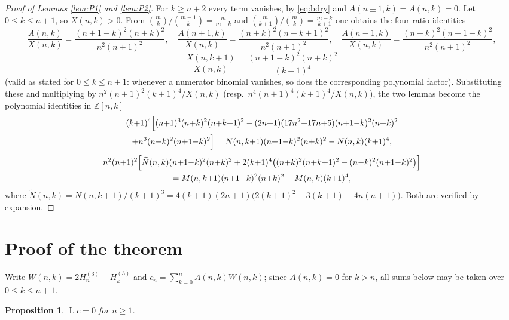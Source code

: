 \documentclass[11pt]{article}
\newtheorem{proposition}{Proposition}
\theoremstyle{remark}
\newcommand{\ZZ}{\mathbb{Z}}
\DeclareMathOperator{\Lop}{L}
\begin{document}
\begin{proof}[Proof of Lemmas \ref{lem:P1} and \ref{lem:P2}]
For $k\ge n+2$ every term vanishes, by \eqref{eq:bdry} and
$A(n\pm1,k)=A(n,k)=0$. Let $0\le k\le n+1$, so $X(n,k)>0$. From
$\binom{m}{k}\big/\binom{m-1}{k}=\frac{m}{m-k}$ and
$\binom{m}{k+1}\big/\binom{m}{k}=\frac{m-k}{k+1}$ one obtains the four ratio
identities
\[
\frac{A(n,k)}{X(n,k)}=\frac{(n{+}1{-}k)^{2}(n{+}k)^{2}}{n^{2}(n{+}1)^{2}},\quad
\frac{A(n{+}1,k)}{X(n,k)}=\frac{(n{+}k)^{2}(n{+}k{+}1)^{2}}{n^{2}(n{+}1)^{2}},\quad
\frac{A(n{-}1,k)}{X(n,k)}=\frac{(n{-}k)^{2}(n{+}1{-}k)^{2}}{n^{2}(n{+}1)^{2}},
\]
\[
\frac{X(n,k+1)}{X(n,k)}=\frac{(n{+}1{-}k)^{2}(n{+}k)^{2}}{(k+1)^{4}}
\]
(valid as stated for $0\le k\le n+1$: whenever a numerator binomial
vanishes, so does the corresponding polynomial factor). Substituting these
and multiplying by $n^{2}(n+1)^{2}(k+1)^{4}/X(n,k)$
(resp.\ $n^{4}(n+1)^{4}(k+1)^{4}/X(n,k)$), the two lemmas become the
polynomial identities in $\ZZ[n,k]$
\begin{multline}\label{eq:poly1}
(k{+}1)^{4}\Bigl[(n{+}1)^{3}(n{+}k)^{2}(n{+}k{+}1)^{2}
-(2n{+}1)(17n^{2}{+}17n{+}5)(n{+}1{-}k)^{2}(n{+}k)^{2}\\
+n^{3}(n{-}k)^{2}(n{+}1{-}k)^{2}\Bigr]
= N(n,k{+}1)(n{+}1{-}k)^{2}(n{+}k)^{2}-N(n,k)(k{+}1)^{4},
\end{multline}
\begin{multline}\label{eq:poly2}
n^{2}(n{+}1)^{2}\Bigl[\widetilde N(n,k)(n{+}1{-}k)^{2}(n{+}k)^{2}
+2(k{+}1)^{4}\bigl((n{+}k)^{2}(n{+}k{+}1)^{2}-(n{-}k)^{2}(n{+}1{-}k)^{2}\bigr)\Bigr]\\
= M(n,k{+}1)(n{+}1{-}k)^{2}(n{+}k)^{2}-M(n,k)(k{+}1)^{4},
\end{multline}
where $\widetilde N(n,k)=N(n,k+1)/(k+1)^{3}
=4(k{+}1)(2n{+}1)\bigl(2(k{+}1)^{2}-3(k{+}1)-4n(n{+}1)\bigr)$.
Both are verified by expansion.
\end{proof}

\section{Proof of the theorem}

Write $W(n,k)=2H^{(3)}_n-H^{(3)}_k$ and
$c_n=\sum_{k=0}^{n}A(n,k)W(n,k)$; since $A(n,k)=0$ for $k>n$, all sums below
may be taken over $0\le k\le n+1$.

\begin{proposition}\label{prop:rec}
$\Lop c=0$ for $n\ge1$.
\end{proposition}
\end{document}
